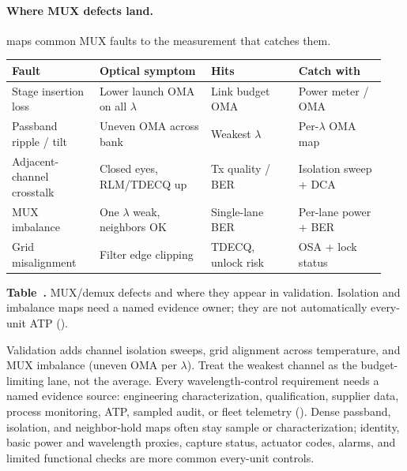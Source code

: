 \paragraph{Where MUX defects land.}
 maps common MUX faults to the measurement that catches them.

\begin{table}[ht]
\label{tab:mux-budget}%
\centering
\setlength{\tabcolsep}{3.5pt}%
\footnotesize
\renewcommand{\arraystretch}{1.25}%
\begin{tabular}{@{}p{0.22\linewidth}p{0.28\linewidth}p{0.22\linewidth}p{0.22\linewidth}@{}}
\toprule
Fault & Optical symptom & Hits & Catch with \\
\midrule
Stage insertion loss & Lower launch OMA on all $\lambda$ & Link budget OMA & Power meter / OMA \\
\addlinespace[1.5em]
Passband ripple / tilt & Uneven OMA across bank & Weakest $\lambda$ & Per-$\lambda$ OMA map \\
\addlinespace[1.5em]
Adjacent-channel crosstalk & Closed eyes, RLM/TDECQ up & Tx quality / BER & Isolation sweep + DCA \\
\addlinespace[1.5em]
MUX imbalance & One $\lambda$ weak, neighbors OK & Single-lane BER & Per-lane power + BER \\
\addlinespace[1.5em]
Grid misalignment & Filter edge clipping & TDECQ, unlock risk & OSA + lock status \\
\bottomrule
\end{tabular}
\par\medskip
{\raggedright\footnotesize\textbf{Table~\thetable.} MUX/demux defects and where they
appear in validation. Isolation and imbalance maps need a named evidence owner;
they are not automatically every-unit ATP
().\par}
\end{table}

Validation adds channel isolation sweeps, grid alignment across temperature, and
MUX imbalance (uneven OMA per $\lambda$). Treat the weakest channel as the
budget-limiting lane, not the average. Every wavelength-control requirement needs
a named evidence source: engineering characterization, qualification, supplier
data, process monitoring, ATP, sampled audit, or fleet telemetry
(). Dense passband, isolation, and
neighbor-hold maps often stay sample or characterization; identity, basic power
and wavelength proxies, capture status, actuator codes, alarms, and limited
functional checks are more common every-unit controls.

